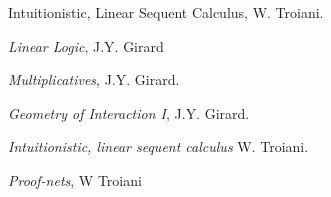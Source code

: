 \documentclass[12pt]{article}
\theoremstyle{plain}
\theoremstyle{definition}
\begin{document}

\providecommand{\bysame}{\leavevmode\hbox to3em{\hrulefill}\thinspace}
\providecommand{\href}[2]{#2}
\begin{thebibliography}{99}
 Intuitionistic, Linear Sequent Calculus, W. Troiani.

 \emph{Linear Logic}, J.Y. Girard

 \emph{Multiplicatives}, J.Y. Girard.

 \emph{Geometry of Interaction I}, J.Y. Girard.

 \emph{Intuitionistic, linear sequent calculus} W. Troiani.

 \emph{Proof-nets}, W Troiani


\end{thebibliography}
\end{document}
